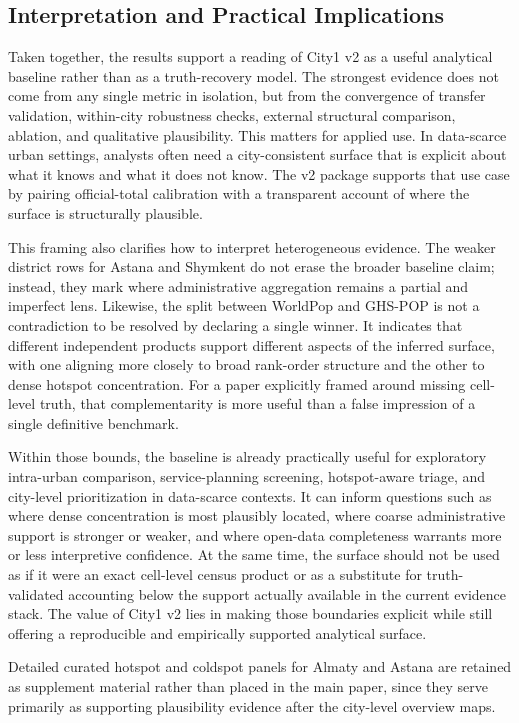 \subsection{Interpretation and Practical Implications}

Taken together, the results support a reading of City1 v2 as a useful analytical baseline rather than as a truth-recovery model. The strongest evidence does not come from any single metric in isolation, but from the convergence of transfer validation, within-city robustness checks, external structural comparison, ablation, and qualitative plausibility. This matters for applied use. In data-scarce urban settings, analysts often need a city-consistent surface that is explicit about what it knows and what it does not know. The v2 package supports that use case by pairing official-total calibration with a transparent account of where the surface is structurally plausible.

This framing also clarifies how to interpret heterogeneous evidence. The weaker district rows for Astana and Shymkent do not erase the broader baseline claim; instead, they mark where administrative aggregation remains a partial and imperfect lens. Likewise, the split between WorldPop and GHS-POP is not a contradiction to be resolved by declaring a single winner. It indicates that different independent products support different aspects of the inferred surface, with one aligning more closely to broad rank-order structure and the other to dense hotspot concentration. For a paper explicitly framed around missing cell-level truth, that complementarity is more useful than a false impression of a single definitive benchmark.

Within those bounds, the baseline is already practically useful for exploratory intra-urban comparison, service-planning screening, hotspot-aware triage, and city-level prioritization in data-scarce contexts. It can inform questions such as where dense concentration is most plausibly located, where coarse administrative support is stronger or weaker, and where open-data completeness warrants more or less interpretive confidence. At the same time, the surface should not be used as if it were an exact cell-level census product or as a substitute for truth-validated accounting below the support actually available in the current evidence stack. The value of City1 v2 lies in making those boundaries explicit while still offering a reproducible and empirically supported analytical surface.

Detailed curated hotspot and coldspot panels for Almaty and Astana are retained as supplement material rather than placed in the main paper, since they serve primarily as supporting plausibility evidence after the city-level overview maps.
